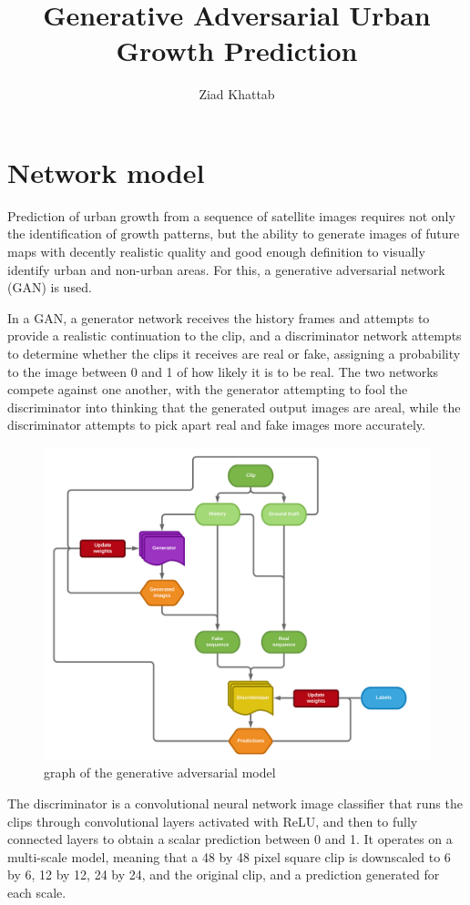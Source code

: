 \documentclass{article}
\title{\huge{Generative Adversarial Urban Growth Prediction}}
\author{Ziad Khattab}
\date{}
\begin{document}
\maketitle

\section{Network model}

Prediction of urban growth from a sequence of satellite images requires not only the identification of growth patterns, but the ability to generate images of future maps with decently realistic quality and good enough definition to visually identify urban and non-urban areas. For this, a generative adversarial network (GAN) is used.

In a GAN, a generator network receives the history frames and attempts to provide a realistic continuation to the clip, and a discriminator network attempts to determine whether the clips it receives are real or fake, assigning a probability to the image between 0 and 1 of how likely it is to be real. The two networks compete against one another, with the generator attempting to fool the discriminator into thinking that the generated output images are areal, while the discriminator attempts to pick apart real and fake images more accurately.

\begin{figure}[H]
    \caption{graph of the generative adversarial model}
    \centering
    \includegraphics[width=0.7\linewidth]{gan-graph.png}
\end{figure}

\clearpage

The discriminator is a convolutional neural network image classifier that runs the clips through convolutional layers activated with ReLU, and then to fully connected layers to obtain a scalar prediction between 0 and 1. It operates on a multi-scale model, meaning that a 48 by 48 pixel square clip is downscaled to 6 by 6, 12 by 12, 24 by 24, and the original clip, and a prediction generated for each scale.
\end{document}
